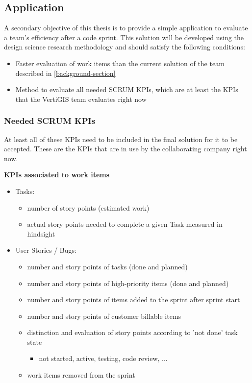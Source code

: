 \subsection{Application}
A secondary objective of this thesis is to provide a simple application to evaluate a team's efficiency after a code sprint. 
This solution will be developed using the design science research methodology and should satisfy the following conditions:

\begin{itemize}
    \item Faster evaluation of work items than the current 
    solution of the team described in \ref{background-section}
    \item Method to evaluate all needed SCRUM KPIs, which are at least the KPIs that the VertiGIS team evaluates right now
\end{itemize}

\subsubsection*{Needed SCRUM KPIs}

At least all of these KPIs need to be included in the final solution for it to be accepted. 
These are the KPIs that are in use by the collaborating company right now.

\textbf{KPIs associated to work items}

\begin{itemize}
    \item Tasks:
    \begin{itemize}
        \item number of story points (estimated work)
        \item actual story points needed to complete a given Task measured in hindsight 
    \end{itemize}
    \item User Stories / Bugs:
    \begin{itemize}
        \item number and story points of tasks (done and planned)
        \item number and story points of high-priority items (done and planned)
        \item number and story points of items added to the sprint after sprint start
        \item number and story points of customer billable items
        \item distinction and evaluation of story points according to 'not done' task state
        \begin{itemize}
            \item not started, active, testing, code review, ...
        \end{itemize}
        \item work items removed from the sprint
    \end{itemize}
\end{itemize}

